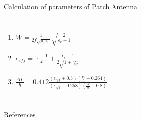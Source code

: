 \documentclass{beamer}
\begin{document}

\begin{frame}{Calculation of parameters of Patch Antenna}
  \begin{columns}
      \begin{enumerate}
        \item <1->\(W = \frac{1}{2f\sqrt{\mu_0\epsilon_0}}\sqrt{\frac{2}{\epsilon_r+1}}\)
        \item <2-> \(\epsilon_{eff} = \frac{\epsilon_r+1}{2} + \frac{\epsilon_r - 1}{2\sqrt{1+\frac{12h}{W}}}\)
        \item <3-> \(\frac{\Delta L}{h} = 0.412\frac{(\epsilon_{eff} + 0.3)\left(\frac{W}{h} + 0.264\right)}{(\epsilon_{eff} - 0.258)\left(\frac{W}{h} + 0.8\right)}\)
      \end{enumerate}
  \end{columns}
\end{frame}

\begin{frame}[allowframebreaks]{References}
  \nocite{*}
  
  
\end{frame} 
\end{document}
